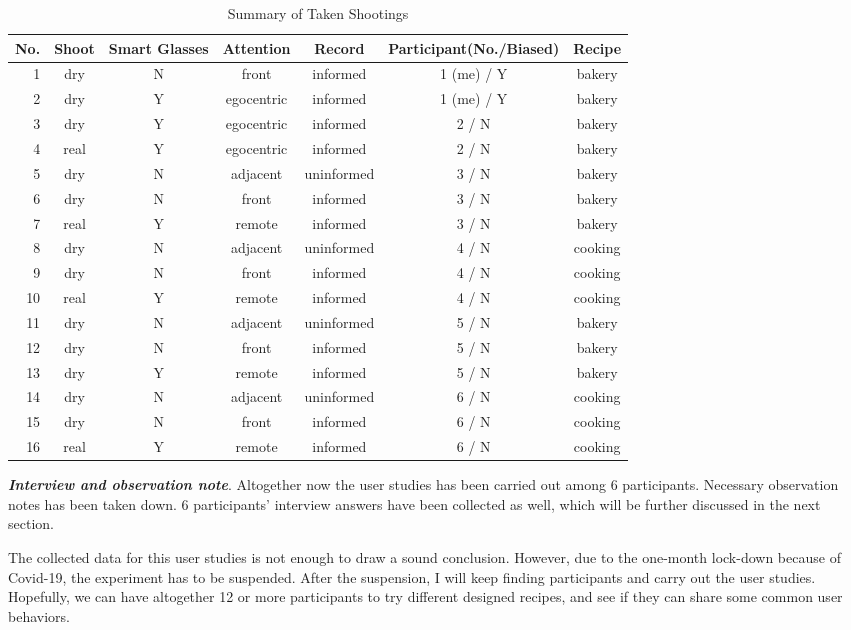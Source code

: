 \documentclass[fyp]{socreport}
\begin{document}
\begin{center}
\small
\begin{table}
\begin{tabular}{rcccccc}
\toprule  
No. & Shoot & Smart Glasses & Attention & Record & Participant(No./Biased) & Recipe \\
\midrule 
1 & dry & N & front & informed & 1 (me) / Y & bakery\\
2 & dry & Y & egocentric & informed & 1 (me) / Y  & bakery\\
3 & dry & Y & egocentric & informed & 2 / N & bakery\\
4 & real & Y & egocentric & informed & 2 / N & bakery\\
5 & dry & N & adjacent & uninformed & 3 / N & bakery\\
6 & dry & N & front & informed & 3 / N & bakery\\
7 & real & Y & remote & informed & 3 / N & bakery\\
8 & dry & N & adjacent & uninformed & 4 / N & cooking\\
9 & dry & N & front & informed & 4 / N & cooking\\
10 & real & Y & remote & informed & 4 / N & cooking\\
11 & dry & N & adjacent & uninformed & 5 / N & bakery\\
12 & dry & N & front & informed & 5 / N & bakery\\
13 & dry & Y & remote & informed & 5 / N & bakery\\
14 & dry & N & adjacent & uninformed & 6 / N &  cooking\\
15 & dry & N & front & informed & 6 / N & cooking\\
16 & real & Y & remote & informed & 6 / N & cooking\\
\bottomrule 
\end{tabular}
\caption{\label{tab:table-name}Summary of Taken Shootings}
\end{table}
\normalsize
\end{center}

\textbf{\textit{Interview and observation note}}. Altogether now the user studies has been carried out among 6 participants. Necessary observation notes has been taken down. 6 participants' interview answers have been collected as well, which will be further discussed in the next section.

The collected data for this user studies is not enough to draw a sound conclusion. However, due to the one-month lock-down because of Covid-19, the experiment has to be suspended. After the suspension, I will keep finding participants and carry out the user studies. Hopefully, we can have altogether 12 or more participants to try different designed recipes, and see if they can share some common user behaviors.
\end{document}
